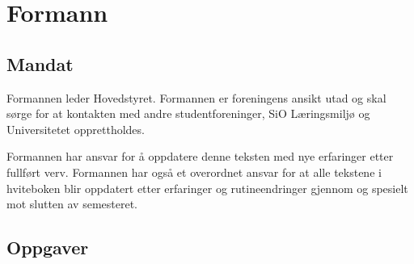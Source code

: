 \section{Formann}

\subsection{Mandat}
Formannen leder Hovedstyret. Formannen er foreningens ansikt utad og skal sørge for at
kontakten med andre studentforeninger, SiO Læringsmiljø og Universitetet opprettholdes.

Formannen har ansvar for å oppdatere denne teksten med nye erfaringer etter fullført verv.
Formannen har også et overordnet ansvar for at alle tekstene i hviteboken blir oppdatert
etter erfaringer og rutineendringer gjennom og spesielt mot slutten av semesteret.


\subsection{Oppgaver}

